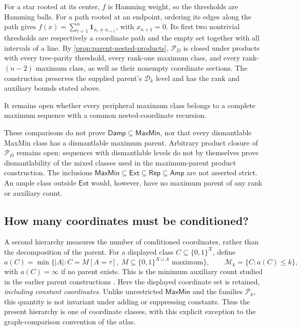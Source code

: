 \documentclass[11pt]{article}
\theoremstyle{definition}
\newcommand{\bits}{\{0,1\}}
\newcommand{\Amp}{\mathsf{Amp}}
\newcommand{\MaxMin}{\mathsf{MaxMin}}
\newcommand{\Damp}{\mathsf{Damp}}
\newcommand{\Rep}{\mathsf{Rep}}
\begin{document}
For a star rooted at its center, $f$ is Hamming weight, so the thresholds
are Hamming balls. For a path rooted at an endpoint, ordering its edges
along the path gives $f(x)=\sum_{i=1}^n\mathbf1_{x_i\ne x_{i+1}}$,
with $x_{n+1}=0$. Its first two nontrivial thresholds are respectively
a coordinate path and the empty set together with all intervals of a line.
By \cref{prop:parent-nested-products}, $\mathcal P_D$ is closed under
products with every tree-parity threshold, every rank-one maximum class,
and every rank-$(n-2)$ maximum class, as well as their nonempty coordinate
sections. The construction preserves the supplied parent's
$\mathcal D_k$ level and has the rank and auxiliary bounds stated above.

It remains open whether every peripheral maximum class belongs to a complete
maximum sequence with a common nested-coordinate recursion.

These comparisons do not prove $\Damp\subseteq\MaxMin$, nor that every
dismantlable MaxMin class has a dismantlable maximum parent. Arbitrary product closure
of $\mathcal P_D$ remains open: sequences with dismantlable levels do not
by themselves prove dismantlability of the mixed classes used in the
maximum-parent product construction. The inclusions
$\MaxMin\subseteq\mathsf{Ext}\subseteq\Rep\subseteq\Amp$
are not asserted strict. An ample class outside $\mathsf{Ext}$ would,
however, have no maximum parent of any rank or auxiliary count.



\subsection{How many coordinates must be conditioned?}
\label{sec:auxiliary-hierarchy}

A second hierarchy measures the number of conditioned coordinates, rather
than the decomposition of the parent. For a displayed class
$C\subseteq\bits^X$, define
\[
 a(C)=\min\{|A|:C=M[A=\tau],\ M\subseteq\bits^{X\sqcup A}
                       \text{ maximum}\},\qquad
 \mathcal M_k=\{C:a(C)\le k\},
\]
with $a(C)=\infty$ if no parent exists. This is the minimum auxiliary
count studied in the earlier parent constructions \cite{MaxParents}.
Here the displayed coordinate set is retained, \emph{including constant
coordinates}. Unlike unrestricted $\MaxMin$ and the families $\mathcal P_k$,
this quantity is not invariant under adding or suppressing constants.
Thus the present hierarchy is one of coordinate classes, with this explicit
exception to the graph-comparison convention of the atlas.
\end{document}
